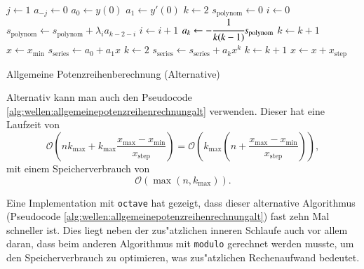 \begin{algorithm}
	\begin{algorithmic}[1]
		\State $j \gets 1$
			\State $a_{-j} \gets 0$
		\EndFor
		\State $a_0 \gets y(0)$
		\State $a_1 \gets y'(0)$
		\State $k \gets 2$
			\State $s_{\text{polynom}} \gets 0$
			\State $i \gets 0$
				\State $s_{\text{polynom}} \gets s_{\text{polynom}}+\lambda_i 
				a_{k-2-i}$
				\State $i \gets i + 1$
			\EndFor
			\State $a_k \gets -\cfrac{1}{k(k-1)} s_{\text{polynom}}$
			\State $k \gets k + 1$
		\EndFor
		\State $x \gets x_{\text{min}}$
			\State $s_{\text{series}} \gets a_0 + a_1x$
			\State $k \gets 2$
				\State $s_{\text{series}} \gets s_{\text{series}} + a_k x^k$
				\State $k \gets k + 1$
			\EndFor
			\State $x \gets x + x_{\text{step}}$
		\EndFor
	\end{algorithmic}
	\caption{Allgemeine Potenzreihenberechnung (Alternative)} 
	\label{alg:wellen:allgemeinepotenzreihenrechnungalt}
\end{algorithm}
Alternativ kann man auch den Pseudocode 
\ref{alg:wellen:allgemeinepotenzreihenrechnungalt} verwenden. Dieser hat eine 
Laufzeit von
\begin{equation*}
	\mathcal{O}
	\left(
		nk_{\text{max}} + k_{\text{max}} 
		\frac{x_{\text{max}}-x_{\text{min}}}{x_{\text{step}}}
	\right)
	=
	\mathcal{O}
	\left(
		k_{\text{max}}
		\left(
			n+\frac{x_{\text{max}}-x_{\text{min}}}{x_{\text{step}}}
		\right)
	\right),
\end{equation*}
mit einem Speicherverbrauch von
\begin{equation*}
	\mathcal{O}
	\left(
		\max(n, k_{\text{max}})
	\right).
\end{equation*}

Eine Implementation mit \texttt{octave} hat gezeigt, dass dieser alternative 
Algorithmus (Pseudocode \ref{alg:wellen:allgemeinepotenzreihenrechnungalt}) 
fast zehn Mal schneller ist. Dies liegt neben der zus"atzlichen inneren 
Schlaufe auch vor allem daran, dass beim anderen Algorithmus mit 
\texttt{modulo} gerechnet werden musste, um den Speicherverbrauch zu 
optimieren, was zus"atzlichen Rechenaufwand bedeutet.
